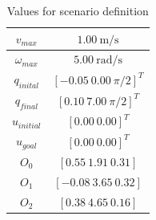 \documentclass[eprint]{actapoly}
\begin{document}
\begin{table}[!h]
\caption {Values for scenario definition} \label{tab:s3param}
\begin{center}
\begin{tabular}{|c|c|}
\hline
$v_{max}$ & $1.00\ \mathrm{m/s}$\\
\hline
$\omega_{max}$ & $5.00\ \mathrm{rad/s}$\\
\hline
$q_{inital}$ & $[-0.05\ 0.00\ \pi/2]^T$\\
\hline
$q_{final}$ & $[0.10\ 7.00\ \pi/2]^T$\\
\hline
$u_{initial}$ & $[0.00\ 0.00]^T$\\
\hline
$u_{goal}$ & $[0.00\ 0.00]^T$\\
\hline
$O_0$ & $[0.55\ 1.91\ 0.31]$\\
\hline
$O_1$ & $[-0.08\ 3.65\ 0.32]$\\
\hline
$O_2$ & $[0.38\ 4.65\ 0.16]$\\
\hline
\end{tabular}
\end{center}
\end{table}
\end{document}
